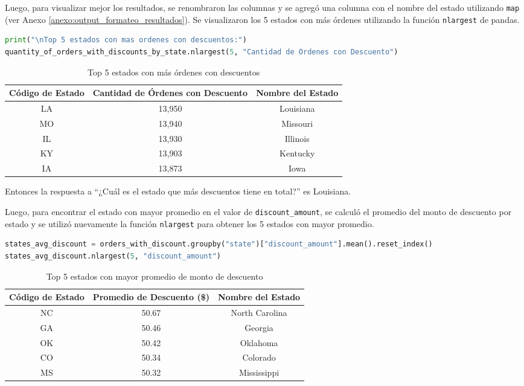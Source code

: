 Luego, para visualizar mejor los resultados, se renombraron las columnas y se agregó una columna con el nombre del estado utilizando \texttt{map} (ver Anexo \ref{anexo:output_formateo_resultados}). Se visualizaron los 5 estados con más órdenes utilizando la función \texttt{nlargest} de pandas.

\begin{lstlisting}[language=Python, xleftmargin=35pt, xrightmargin=35pt]
print("\nTop 5 estados con mas ordenes con descuentos:")
quantity_of_orders_with_discounts_by_state.nlargest(5, "Cantidad de Ordenes con Descuento")
\end{lstlisting}
\begin{table}[H]
\centering

\begin{tabular}{|c|c|c|}
\hline
\textbf{Código de Estado} & \textbf{Cantidad de Órdenes con Descuento} & \textbf{Nombre del Estado} \\
\hline
LA & 13,950 & Louisiana \\
MO & 13,940 & Missouri \\
IL & 13,930 & Illinois \\
KY & 13,903 & Kentucky \\
IA & 13,873 & Iowa \\
\hline
\end{tabular}
\caption{Top 5 estados con más órdenes con descuentos}
\end{table}

Entonces la respuesta a ``¿Cuál es el estado que más descuentos tiene en total?'' es Louisiana.

Luego, para encontrar el estado con mayor promedio en el valor de \texttt{discount\_amount}, se calculó el promedio del monto de descuento por estado y se utilizó nuevamente la función \texttt{nlargest} para obtener los 5 estados con mayor promedio.

\begin{lstlisting}[language=Python, xleftmargin=26pt, xrightmargin=26pt]
states_avg_discount = orders_with_discount.groupby("state")["discount_amount"].mean().reset_index()
states_avg_discount.nlargest(5, "discount_amount")
\end{lstlisting}

\begin{table}[H]
\centering
\begin{tabular}{|c|c|c|}
\hline
\textbf{Código de Estado} & \textbf{Promedio de Descuento (\$)} & \textbf{Nombre del Estado} \\
\hline
NC & 50.67 & North Carolina \\
GA & 50.46 & Georgia \\
OK & 50.42 & Oklahoma \\
CO & 50.34 & Colorado \\
MS & 50.32 & Mississippi \\
\hline
\end{tabular}
\caption{Top 5 estados con mayor promedio de monto de descuento}
\end{table}

